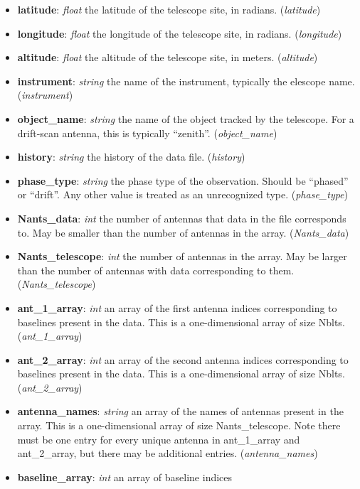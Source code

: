 \documentclass[11pt, oneside]{article}
\begin{document}
\begin{itemize}
\item \textbf{latitude}: \textit{float} the latitude of the telescope site, in
  radians. (\textit{latitude})
\item \textbf{longitude}: \textit{float} the longitude of the telescope site, in
  radians. (\textit{longitude})
\item \textbf{altitude}: \textit{float} the altitude of the telescope site, in
  meters. (\textit{altitude})
\item \textbf{instrument}: \textit{string} the name of the instrument, typically
  the elescope name. (\textit{instrument})
\item \textbf{object_name}: \textit{string} the name of the object tracked by
  the telescope. For a drift-scan antenna, this is typically
  ``zenith''. (\textit{object_name})
\item \textbf{history}: \textit{string} the history of the data
  file. (\textit{history})
\item \textbf{phase_type}: \textit{string} the phase type of the
  observation. Should be ``phased'' or ``drift''. Any other value is treated as
  an unrecognized type. (\textit{phase_type})
\item \textbf{Nants_data}: \textit{int} the number of antennas that data in the
  file corresponds to. May be smaller than the number of antennas in the
  array. (\textit{Nants_data})
\item \textbf{Nants_telescope}: \textit{int} the number of antennas in the
  array. May be larger than the number of antennas with data corresponding to
  them. (\textit{Nants_telescope})
\item \textbf{ant_1_array}: \textit{int} an array of the first antenna indices
  corresponding to baselines present in the data. This is a one-dimensional
  array of size Nblts. (\textit{ant_1_array})
\item \textbf{ant_2_array}: \textit{int} an array of the second antenna indices
  corresponding to baselines present in the data. This is a one-dimensional
  array of size Nblts. (\textit{ant_2_array})
\item \textbf{antenna_names}: \textit{string} an array of the names of antennas
  present in the array. This is a one-dimensional array of size
  Nants_telescope. Note there must be one entry for every unique antenna in
  ant_1_array and ant_2_array, but there may be additional
  entries. (\textit{antenna_names})
\item \textbf{baseline_array}: \textit{int} an array of baseline indices

\end{itemize}
\end{document}
